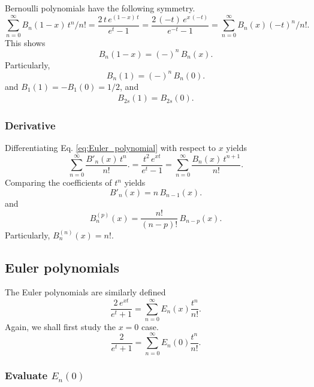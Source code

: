\documentclass[aip,jcp,preprint,notitlepage, superscriptaddress]{revtex4-1}
\begin{document}
Bernoulli polynomials have the following symmetry.
%
\begin{equation*}
\sum_{n = 0}^\infty
B_n(1 - x) \, t^n/n!
=
\frac{ 2 \, t \, e^{(1 - x) \, t} }
{ e^t - 1 }
=
\frac{ 2 \, (-t) \, e^{ x \, (-t)} }
{ e^{-t} - 1 }
=
\sum_{n = 0}^\infty
B_n(x) (-t)^n / n!.
\end{equation*}
%
This shows
\[
B_n(1 - x) = (-)^n \, B_n(x).
\]
Particularly,
\[
B_n(1) = (-)^n \, B_n(0).
\]
and $B_1(1) = -B_1(0) = 1/2$, and
\begin{align}
B_{2s}(1) = B_{2s}(0).
\label{eq:Bernoulli1_even}
\end{align}



\subsubsection{Derivative}




Differentiating Eq. \eqref{eq:Euler_polynomial}
with respect to $x$ yields
\[
\sum_{n = 0}^\infty \frac{ B'_n(x) \, t^{n} } { n! }.
=
\frac{ t^2 \, e^{x t} }
{ e^t - 1 }
=
\sum_{n = 0}^\infty \frac{ B_n(x) \, t^{n + 1} } { n! }.
\]
Comparing the coefficients of $t^n$ yields
\[
B'_n(x)
=
n \, B_{n-1}(x).
\]
and
\begin{equation}
  B^{(p)}_n(x)
=
\frac{n!}{(n-p)!} \, B_{n-p}(x).
\label{eq:dBernoulli_polynomial}
\end{equation}
Particularly,
$B^{(n)}_n(x) = n!$.



\subsection{Euler polynomials}



The Euler polynomials are similarly defined
%
\begin{equation}
  \frac{ 2 \, e^{x t} }
  {e^t + 1}
=
\sum_{n = 0}^\infty
  E_n(x) \frac{ t^n } { n! }.
\label{eq:Euler_polynomial}
\end{equation}
%
Again, we shall first study the $x = 0$ case.
%
\begin{equation}
  \frac{ 2 }
  {e^t + 1}
=
\sum_{n = 0}^\infty
  E_n(0) \frac{ t^n } { n! }.
\label{eq:Euler0}
\end{equation}



\subsubsection{Evaluate $E_n(0)$}
\end{document}
